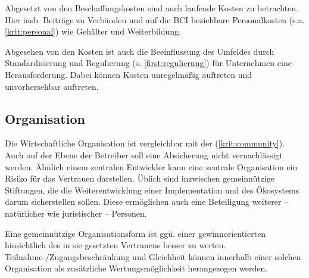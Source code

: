 Abgesetzt von den Beschaffungskosten sind auch laufende Kosten zu betrachten.
Hier insb. Beiträge zu Verbänden und auf die \gls{BCI} beziehbare Personalkosten (s.a. \ref{krit:personal}) wie Gehälter und Weiterbildung.

Abgesehen von den Kosten ist auch die Beeinflussung des Umfeldes durch
Standardisierung und Regulierung (\label{regulierung}s. \ref{first:regulierung}) für Unternehmen eine Herausforderung.
Dabei können Kosten unregelmäßig auftreten und unvorhersehbar auftreten.

\subsection{Organisation}

Die Wirtschaftliche Organisation ist vergleichbar mit der  (\ref{krit:community}).
Auch auf der Ebene der Betreiber soll eine Absicherung nicht vernachlässigt werden.
Ähnlich einem zentralen Entwickler kann eine zentrale Organisation ein Risiko für das Vertrauen darstellen.
Üblich sind inzwischen gemeinnützige Stiftungen, die die Weiterentwicklung einer Implementation und des Ökosystems darum sicherstellen sollen.
Diese ermöglichen auch eine Beteiligung weiterer -- natürlicher wie juristischer -- Personen.

Eine gemeinnützige Organisationsform ist ggü. einer gewinnorientierten hinsichtlich des in sie gesetzten Vertrauens besser zu werten.
Teilnahme-/Zugangsbeschränkung und Gleichheit können innerhalb einer solchen Organisation als zusätzliche Wertungsmöglichkeit herangezogen werden.
